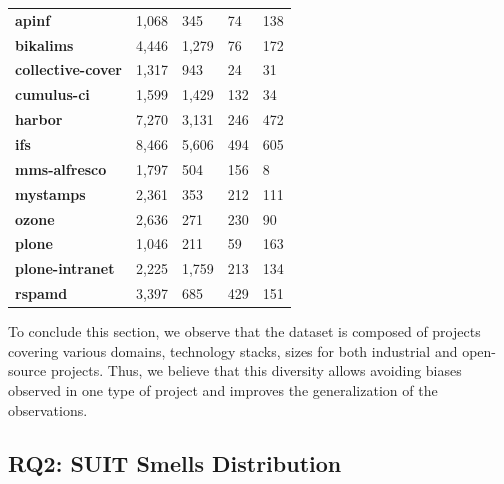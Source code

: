 \begin{table}
\begin{tabular}{>{\raggedright}p{0.9in}>{\raggedleft}p{0.7in}>{\raggedleft}p{0.7in}>{\raggedleft}p{0.7in}>{\raggedleft}p{0.7in}}
\scriptsize{\textbf{apinf}} & \scriptsize{1,068} & \scriptsize{345} & \scriptsize{74} & \scriptsize{138} \tabularnewline
\scriptsize{\textbf{bikalims}} & \scriptsize{4,446} & \scriptsize{1,279} & \scriptsize{76} & \scriptsize{172} \tabularnewline
\scriptsize{\textbf{collective-cover}} & \scriptsize{1,317} & \scriptsize{943} & \scriptsize{24} & \scriptsize{31} \tabularnewline
\scriptsize{\textbf{cumulus-ci}} & \scriptsize{1,599} & \scriptsize{1,429} & \scriptsize{132} & \scriptsize{34} \tabularnewline
\scriptsize{\textbf{harbor}} & \scriptsize{7,270} & \scriptsize{3,131} & \scriptsize{246} & \scriptsize{472} \tabularnewline
\scriptsize{\textbf{ifs}} & \scriptsize{8,466} & \scriptsize{5,606} & \scriptsize{494} & \scriptsize{605} \tabularnewline
\scriptsize{\textbf{mms-alfresco}} & \scriptsize{1,797} & \scriptsize{504} & \scriptsize{156} & \scriptsize{8} \tabularnewline
\scriptsize{\textbf{mystamps}} & \scriptsize{2,361} & \scriptsize{353} & \scriptsize{212} & \scriptsize{111} \tabularnewline
\scriptsize{\textbf{ozone}} & \scriptsize{2,636} & \scriptsize{271} & \scriptsize{230} & \scriptsize{90} \tabularnewline
\scriptsize{\textbf{plone}} & \scriptsize{1,046} & \scriptsize{211} & \scriptsize{59} & \scriptsize{163} \tabularnewline
\scriptsize{\textbf{plone-intranet}} & \scriptsize{2,225} & \scriptsize{1,759} & \scriptsize{213} & \scriptsize{134} \tabularnewline
\scriptsize{\textbf{rspamd}} & \scriptsize{3,397} & \scriptsize{685} & \scriptsize{429} & \scriptsize{151} \tabularnewline

\bottomrule

\end{tabular}

\end{table}

To conclude this section, we observe that the dataset is composed of projects covering various domains, technology stacks, sizes for both industrial and open-source projects. Thus, we believe that this diversity allows avoiding biases observed in one type of project and improves the generalization of the observations.

\subsection{RQ2: SUIT Smells Distribution}
\label{sec:smell-detection}

